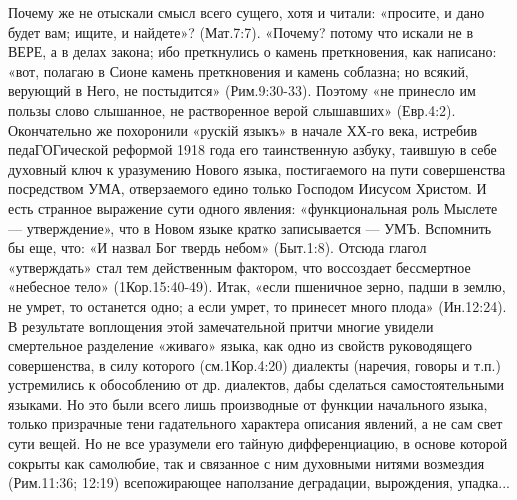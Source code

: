       Почему же не отыскали смысл всего сущего, хотя и читали: «просите, и дано будет вам; ищите, и найдете»? (Мат.7:7). «Почему?  потому что искали не в ВЕРЕ, а в делах закона;  ибо преткнулись о камень преткновения, как написано: «вот, полагаю в Сионе камень преткновения и камень соблазна;  но всякий, верующий в Него, не постыдится» (Рим.9:30-33). Поэтому «не принесло им пользы слово слышанное, не растворенное верой слышавших» (Евр.4:2). Окончательно же похоронили «рускій языкъ» в начале ХХ-го века, истребив педаГОГической реформой 1918 года его таинственную азбуку, таившую в себе духовный ключ к уразумению Нового языка, постигаемого на пути совершенства посредством УМА, отверзаемого едино только Господом Иисусом Христом. И есть странное выражение сути одного явления: «функциональная роль Мыслете --- утверждение», что в Новом языке кратко записывается --- УМЪ.
Вспомнить бы еще, что: «И назвал Бог твердь небом» (Быт.1:8). Отсюда глагол «утверждать» стал тем действенным фактором, что воссоздает бессмертное «небесное тело» (1Кор.15:40-49).
      Итак, «если пшеничное зерно, падши в землю, не умрет, то останется одно; а если умрет, то принесет много плода» (Ин.12:24). В результате воплощения этой замечательной притчи многие увидели смертельное разделение «живаго» языка, как одно из свойств руководящего совершенства, в силу которого (см.1Кор.4:20) диалекты (наречия, говоры и т.п.) устремились к обособлению от др. диалектов, дабы сделаться самостоятельными языками. Но это были всего лишь производные от функции начального языка, только призрачные тени гадательного характера описания явлений, а не сам свет сути вещей. Но не все уразумели его тайную дифференциацию, в основе которой сокрыты как самолюбие, так и связанное с ним духовными нитями возмездия (Рим.11:36; 12:19)  всепожирающее наползание деградации, вырождения, упадка...

